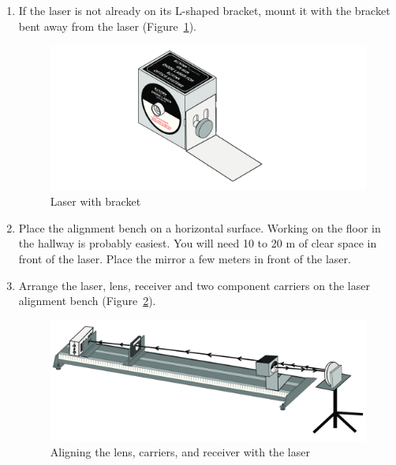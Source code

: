 \documentclass{tufte-handout}
\begin{document}
\begin{enumerate}
\item If the laser is not already on its L-shaped bracket, mount it with the
bracket bent away from the laser (Figure~\ref{fig:laser}).
\begin{figure}[h]
\includegraphics{../images/diode-laser.jpg}
\caption{\label{fig:laser} Laser with bracket}
\end{figure}

\item Place the alignment bench on a horizontal surface. Working on the floor in the hallway is probably easiest.  You will need 
10 to 20 m of clear space in front of the laser.  Place the mirror a few meters in front of the laser.


\item Arrange the laser, lens, receiver and two component carriers on the
laser alignment bench (Figure~\ref{fig:align}).
\begin{figure}[h]
\includegraphics{../images/aligning.jpg}
\caption{\label{fig:align} Aligning the lens, carriers, and receiver with the laser }
\end{figure}


\end{enumerate}
\end{document}
